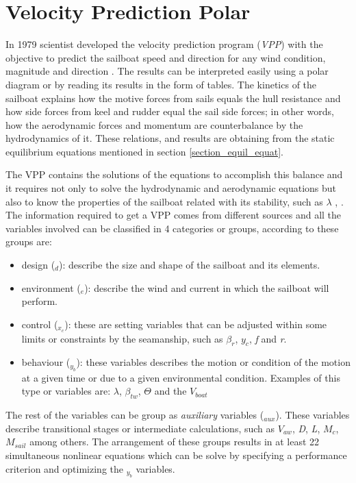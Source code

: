 \section{Velocity Prediction Polar} \label{sec:VPP}
In 1979 scientist developed the velocity prediction  program (\textit{VPP}) with the objective to predict the sailboat speed and direction for any wind condition, magnitude and direction \cite{larsonprinciples}. The results can be interpreted easily using a polar diagram or by reading its results in the form of tables.  The kinetics of the sailboat explains how the motive forces from sails equals the hull resistance and how side forces from keel and rudder equal the sail side forces; in other words, how the aerodynamic forces and momentum are counterbalance by the hydrodynamics of it. These relations, and results are obtaining from the static equilibrium equations mentioned in section \ref{section_equil_equat}.\par 
The VPP contains the solutions of the equations to  accomplish this balance and it requires not only to solve the hydrodynamic and aerodynamic equations but also to know the properties of the sailboat related with its stability, such as $\lambda$ \cite{larsonprinciples}, \cite{milgram1998fluid}. The information required to get a VPP comes from different sources and all the variables involved can be classified in 4 categories or groups, according to \cite{philpott1993yacht} these groups are:
\begin{itemize}
    \item design (\textit{$_{d}$}): describe the size and shape of the sailboat and its elements.
    \item environment (\textit{$_{e}$}): describe the wind and current in which the sailboat will perform.
    \item control (\textit{$_{x_{c}}$}): these are setting variables that can be adjusted within some limits or constraints by the seamanship, such as $\beta_{r}$, $y_{c}$, \textit{f} and \textit{r}.
    \item behaviour (\textit{$_{y_{b}}$}): these variables describes the motion or condition of the motion at a given time or due to a given environmental condition. Examples of this type or variables are: $\lambda$, $\beta_{tw}$, $\Theta$ and the $V_{boat}$
\end{itemize}
The rest of the variables can be group as \textit{auxiliary} variables (\textit{$_{aux}$}). These variables describe transitional stages or intermediate calculations, such as $V_{aw}$, \textit{D}, \textit{L}, $M_{c}$, $M_{sail}$ among others. The arrangement of these groups results in at least 22 simultaneous nonlinear equations which can be solve by specifying a performance criterion and optimizing the \textit{$_{y_{b}}$} variables.
 
